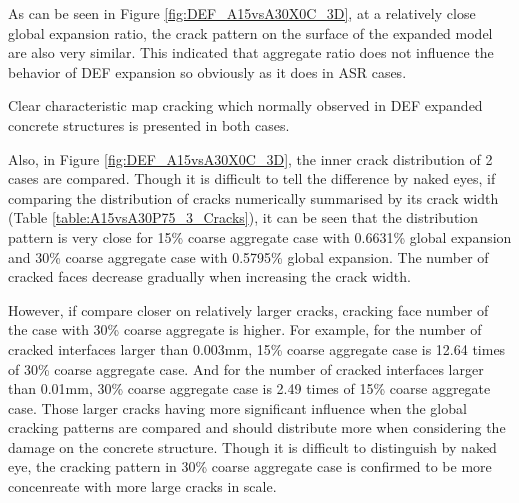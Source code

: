 As can be seen in Figure \ref{fig:DEF_A15vsA30X0C_3D}, at a relatively close global expansion ratio, the crack pattern on the surface of the expanded model are also very similar. This indicated that aggregate ratio does not influence the behavior of DEF expansion so obviously as it does in ASR cases.

Clear characteristic map cracking which normally observed in DEF expanded concrete structures is presented in both cases.

Also, in Figure \ref{fig:DEF_A15vsA30X0C_3D}, the inner crack distribution of 2 cases are compared. Though it is difficult to tell the difference by naked eyes, if comparing the distribution of cracks numerically summarised by its crack width (Table \ref{table:A15vsA30P75_3_Cracks}),  it can be seen that the distribution pattern is very close for 15\% coarse aggregate case with 0.6631\% global expansion and  30\% coarse aggregate case with 0.5795\% global expansion. The number of cracked faces decrease gradually when increasing the crack width.

However, if compare closer on relatively larger cracks, cracking face number of the case with 30\% coarse aggregate is higher. For example, for the number of cracked interfaces larger than 0.003mm, 15\% coarse aggregate case is 12.64 times of 30\% coarse aggregate case. And for the number of cracked interfaces larger than 0.01mm, 30\% coarse aggregate case is 2.49 times of 15\% coarse aggregate case.  Those larger cracks having more significant influence when the global cracking patterns are compared and should distribute more when considering the damage on the concrete structure. Though it is difficult to distinguish by naked eye, the cracking pattern in 30\% coarse aggregate case is confirmed to be more concenreate with more large cracks in scale.
